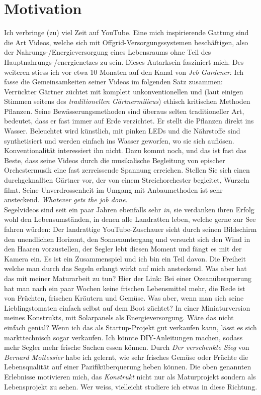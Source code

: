 \documentclass[12pt,titlepage,a4paper]{article}
\begin{document}
\section{Motivation}
Ich verbringe (zu) viel Zeit auf YouTube. Eine mich inspirierende Gattung sind die Art Videos, welche sich mit Offgrid-Versorgungssystemen beschäftigen, also der Nahrungs-/Energieversorgung eines Lebensraums ohne Teil des Hauptnahrungs-/energienetzes zu sein. Dieses Autarksein fasziniert mich. Des weiteren stiess ich vor etwa 10 Monaten auf den Kanal von \textit{Jeb Gardener}. Ich fasse die Gemeinsamkeiten seiner Videos im folgenden Satz zusammen: Verrückter Gärtner züchtet mit komplett unkonventionellen und (laut einigen Stimmen seitens des \textit{traditionellen Gärtnermilieus}) ethisch kritischen Methoden Pflanzen. Seine Bewässerungsmethoden sind überaus selten traditioneller Art, bedeutet, dass er fast immer auf Erde verzichtet. Er stellt die Pflanzen direkt ins Wasser. Beleuchtet wird künstlich, mit pinken LEDs und die Nährstoffe sind synthetisiert und werden einfach ins Wasser geworfen, wo sie sich auflösen. Konventionalität interessiert ihn nicht. Dazu kommt noch, und das ist fast das Beste, dass seine Videos durch die musikalische Begleitung von epischer Orchestermusik eine fast zerreissende Spannung erreichen. Stellen Sie sich einen durchgeknallten Gärtner vor, der von einem Streichorchester begleitet, Wurzeln filmt. Seine Unverdrossenheit im Umgang mit Anbaumethoden ist sehr ansteckend. \textit{Whatever gets the job done.} \\ Segelvideos sind seit ein paar Jahren ebenfalls sehr \textit{in}, sie verdanken ihren Erfolg wohl den Lebensumständen, in denen alle Landratten leben, welche gerne zur See fahren würden: Der landrattige YouTube-Zuschauer sieht durch seinen Bildschirm den unendlichen Horizont, den Sonnenuntergang und versucht sich den Wind in den Haaren vorzustellen, der Segler lebt diesen Moment und fängt es mit der Kamera ein. Es ist ein Zusammenspiel und ich bin ein Teil davon. Die Freiheit welche man durch das Segeln erlangt wirkt auf mich ansteckend. Was aber hat das mit meiner Maturarbeit zu tun? Hier der Link: Bei einer Ozeanüberquerung hat man nach ein paar Wochen keine frischen Lebensmittel mehr, die Rede ist von Früchten, frischen Kräutern und Gemüse. Was aber, wenn man sich seine Lieblingstomaten einfach selbst auf dem Boot züchtet? In einer Miniaturversion meines Konstrukts, mit Solarpanels als Energieversorgung. Wäre das nicht einfach genial? Wenn ich das als Startup-Projekt gut verkaufen kann, lässt es sich markttechnisch sogar verkaufen. Ich könnte DIY-Anleitungen machen, sodass mehr Segler mehr frische Sachen essen können. Durch \textit{Der verschenkte Sieg} von \textit{Bernard Moitessier} habe ich gelernt, wie sehr frisches Gemüse oder Früchte die Lebensqualität auf einer Pazifiküberquerung heben können. Die oben genannten Erlebnisse motivieren mich, das \textit{Konstrukt} nicht nur als Maturprojekt sondern als Lebensprojekt zu sehen. Wer weiss, vielleicht studiere ich etwas in diese Richtung.
\end{document}
